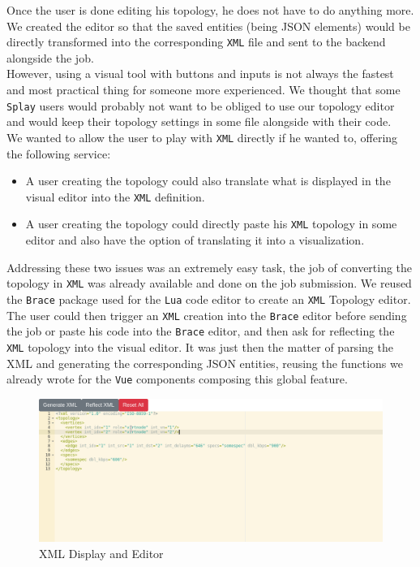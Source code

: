 \documentclass{eplmastersthesis}
\begin{document}
        Once the user is done editing his topology, he does not have to
        do anything more. We created the editor so that the saved entities
        (being JSON elements) would be directly transformed into the
        corresponding \texttt{XML} file and sent to the backend alongside the
        job.\\

        However, using a visual tool with buttons and inputs is not always
        the fastest and most practical thing for someone more experienced. We
        thought that some \texttt{Splay} users would probably not want to be obliged
        to use our topology editor and would keep their topology
        settings in some file alongside with their code.\\
        We wanted to allow the user to play with \texttt{XML} directly
        if he wanted to, offering the following service:

        \begin{itemize}
          \item A user creating the topology could also translate what is
          displayed in the visual editor into the \texttt{XML} definition.
          \item A user creating the topology could directly paste
          his \texttt{XML} topology in some editor and also have the option of
          translating it into a visualization.
        \end{itemize}

        Addressing these two issues was an extremely easy task, the job of
        converting the topology in \texttt{XML} was already available and done on
        the job submission. We reused the \texttt{Brace} package used
        for the \texttt{Lua} code editor to create an \texttt{XML} Topology editor.\\
        The user could then trigger an \texttt{XML} creation into the \texttt{Brace} editor
        before sending the job or paste his code into the \texttt{Brace} editor, and
        then ask for reflecting the \texttt{XML} topology into the visual editor. It
        was just then the matter of parsing the XML and generating the
        corresponding JSON entities, reusing the functions we already wrote
        for the \texttt{Vue} components composing this global feature.

        \begin{figure}[H]
          \centering
          \includegraphics[scale=0.5]{figures/xml_topology.png}
          \caption{\label{xml_topology} XML Display and Editor}
        \end{figure}
\end{document}
